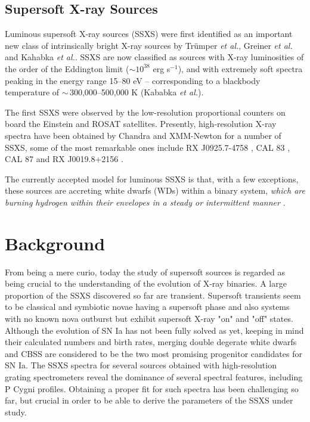         \subsection{Supersoft X-ray Sources} \label{introduction:introduction:sss}
        	Luminous supersoft X-ray sources (SSXS) were first identified as an important new class of intrinsically bright X-ray sources by Tr{\"u}mper \emph{et al.}\cite{trumper91}, Greiner \emph{et al.}\cite{greiner91} and Kahabka \emph{et al.}\cite{kahabka06}. SSXS are now classified as sources with X-ray luminosities of the order of the Eddington limit ($\sim 10^{38}$ erg s$^{-1}$), and with extremely soft spectra peaking in the energy range 15--80 eV -- corresponding to a blackbody temperature of $\sim\,$300,000--500,000 K (Kababka \emph{et al.})\cite{kahabka97}.
        	
        	The first SSXS were observed by the low-resolution proportional counters on board the Einstein and ROSAT satellites. Presently, high-resolution X-ray spectra have been obtained by Chandra and XMM-Newton for a number of SSXS, some of the most remarkable ones include RX J0925.7-4758 \cite{bearda2002,motch2002}, CAL 83 \cite{lanz2005}, CAL 87 \cite{orio2004} and RX J0019.8+2156 \cite{schwarz2004}.
        	
        	The currently accepted model for luminous SSXS is that, with a few exceptions, these sources are accreting white dwarfs (WDs) within a binary system, \emph{which are burning hydrogen within their envelopes in a steady or intermittent manner} \cite{vandenHeuvel92}.
    
    \section{Background} \label{introduction:background}
        From being a mere curio, today the study of supersoft sources is regarded as being crucial to the understanding of the evolution of X-ray binaries. A large proportion of the SSXS discovered so far are transient. Supersoft transients seem to be classical and symbiotic novae having a supersoft phase and also systems with no known nova outburst but exhibit supersoft X-ray "on" and "off" states. Although the evolution of SN Ia has not been fully solved as yet, keeping in mind their calculated numbers and birth rates, merging double degerate white dwarfs and CBSS are considered to be the two most promising progenitor candidates for SN Ia. The SSXS spectra for several sources obtained with high-resolution grating spectrometers reveal the dominance of several spectral features, including P Cygni profiles. Obtaining a proper fit for such spectra has been challenging so far, but crucial in order to be able to derive the parameters of the SSXS under study.
    
